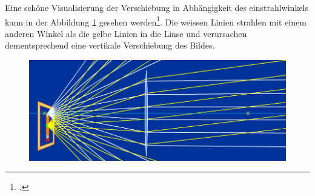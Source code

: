 Eine   sch\"one  Visualisierung   der  Verschiebung   in  Abh\"angigkeit   des
einstrahlwinkels  kann  in  der Abbildung  \ref{fig:lense-simulation}  gesehen
werden\footcite{ref:linsen-simulation}. Die   weissen   Linien  strahlen   mit
einem  anderen Winkel  als  die  gelbe Linien  in  die  Linse und  verursachen
dementsprechend eine vertikale Verschiebung des Bildes.

\begin{figure}[H]
    \center
    \includegraphics[width=.8\textwidth]{images/lense-simulation.png}
    \caption{}
    \label{fig:lense-simulation}
\end{figure}

